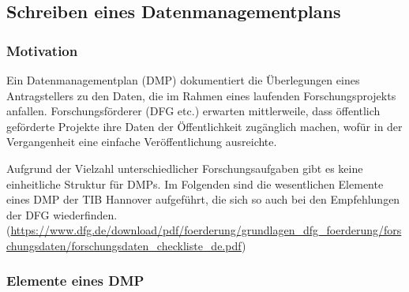 \subsection{Schreiben eines Datenmanagementplans}

\subsubsection{Motivation}

Ein Datenmanagementplan (DMP) dokumentiert die Überlegungen eines Antragstellers
zu den Daten, die im Rahmen eines laufenden Forschungsprojekts anfallen.
Forschungsförderer (DFG etc.) erwarten mittlerweile, dass öffentlich geförderte
Projekte ihre Daten der Öffentlichkeit zugänglich machen, wofür in der
Vergangenheit eine einfache Veröffentlichung ausreichte.

Aufgrund der Vielzahl unterschiedlicher Forschungsaufgaben gibt es keine
einheitliche Struktur für DMPs. Im Folgenden sind die wesentlichen Elemente
eines DMP der TIB Hannover aufgeführt, die sich so auch bei den Empfehlungen der
DFG wiederfinden.\\
(\url{https://www.dfg.de/download/pdf/foerderung/grundlagen_dfg_foerderung/forschungsdaten/forschungsdaten_checkliste_de.pdf})

\subsubsection{Elemente eines DMP}

